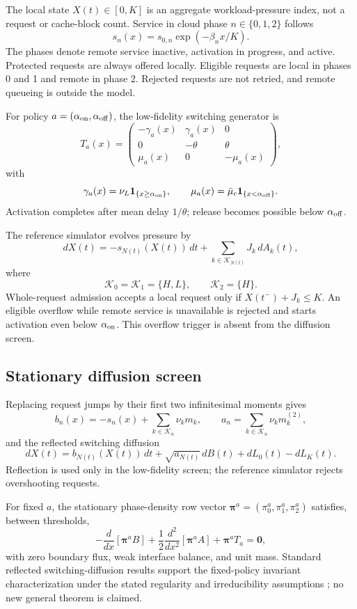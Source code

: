 \documentclass[futureinternet,article,submit,moreauthors]{Definitions/mdpi}
\begin{document}
The local state $X(t)\in[0,K]$ is an aggregate workload-pressure index, not a request or cache-block count. Service in cloud phase $n\in\{0,1,2\}$ follows
\[
s_n(x)=s_{0,n}\exp(-\beta_n x/K).
\]
The phases denote remote service inactive, activation in progress, and active. Protected requests are always offered locally. Eligible requests are local in phases 0 and 1 and remote in phase 2. Rejected requests are not retried, and remote queueing is outside the model.

For policy $a=(\alpha_{\rm on},\alpha_{\rm off})$, the low-fidelity switching generator is
\[
T_a(x)=
\begin{pmatrix}
-\gamma_a(x)&\gamma_a(x)&0\\
0&-\theta&\theta\\
\mu_a(x)&0&-\mu_a(x)
\end{pmatrix},
\]
with
\[
\gamma_a(x)=\nu_L\mathbf 1_{\{x\geq\alpha_{\rm on}\}},
\qquad
\mu_a(x)=\bar\mu_c\mathbf 1_{\{x<\alpha_{\rm off}\}}.
\]
Activation completes after mean delay $1/\theta$; release becomes possible below $\alpha_{\rm off}$.

The reference simulator evolves pressure by
\[
dX(t)=-s_{N(t)}(X(t))\,dt+
\sum_{k\in\mathcal K_{N(t)}}J_k\,dA_k(t),
\]
where
\[
\mathcal K_0=\mathcal K_1=\{H,L\},
\qquad
\mathcal K_2=\{H\}.
\]
Whole-request admission accepts a local request only if $X(t^-)+J_k\leq K$. An eligible overflow while remote service is unavailable is rejected and starts activation even below $\alpha_{\rm on}$. This overflow trigger is absent from the diffusion screen.

\subsection{Stationary diffusion screen}

Replacing request jumps by their first two infinitesimal moments gives
\[
b_n(x)=-s_n(x)+\sum_{k\in\mathcal K_n}\nu_km_k,
\qquad
a_n=\sum_{k\in\mathcal K_n}\nu_km_k^{(2)},
\]
and the reflected switching diffusion
\[
dX(t)=b_{N(t)}(X(t))\,dt+\sqrt{a_{N(t)}}\,dB(t)+dL_0(t)-dL_K(t).
\]
Reflection is used only in the low-fidelity screen; the reference simulator rejects overshooting requests.

For fixed $a$, the stationary phase-density row vector
$\boldsymbol{\pi}^a=(\pi_0^a,\pi_1^a,\pi_2^a)$ satisfies, between thresholds,
\[
-\frac{d}{dx}\!\left[\boldsymbol{\pi}^a B\right]
+\frac12\frac{d^2}{dx^2}\!\left[\boldsymbol{\pi}^a A\right]
+\boldsymbol{\pi}^aT_a=\boldsymbol 0,
\]
with zero boundary flux, weak interface balance, and unit mass. Standard reflected switching-diffusion results support the fixed-policy invariant characterization under the stated regularity and irreducibility assumptions \cite{jang2008reflected,yin2010hybrid,shao2018invariant,kang2014stationary}; no new general theorem is claimed.
\end{document}
